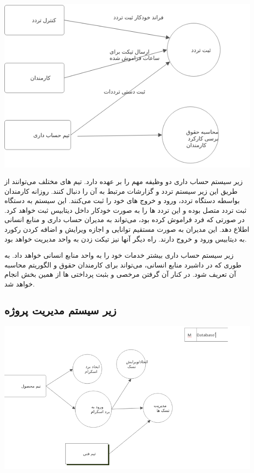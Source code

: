 \includegraphics[scale=0.8]{assets/finance_dfd.png}

زیر سیستم حساب داری دو وظیفه مهم را بر عهده دارد. تیم های مختلف می‌توانند از طریق این زیر سیستم تردد و گزارشات مرتبط به آن را دنبال کنند.
روزانه کارمندان بواسطه دستگاه تردد، ورود و خروج های خود را ثبت می‌کنند.
این سیستم به دستگاه ثبت تردد متصل بوده و این تردد ها را به صورت خودکار داخل دیتابیس ثبت خواهد کرد.
در صورتی که فرد فراموش کرده بود، می‌تواند به مدیران حساب داری و منابع انسانی اطلاع دهد. این مدیران به صورت مستقیم
توانایی و اجازه ویرایش و اضافه کردن رکورد به دیتابیس ورود و خروج دارند.
راه دیگر آنها نیز تیکت زدن به واحد مدیریت خواهد بود.

زیر سیستم حساب داری بیشتر خدمات خود را به واحد منابع انسانی خواهد داد. به طوری که در داشبرد منابع انسانی، می‌تواند برای کارمندان
حقوق و الگوریتم محاسبه آن تعریف شود. در کنار آن گرفتن مرخصی و بثبت پرداختی ها از همین بخش انجام خواهد شد.

\subsection{زیر سیستم مدیریت پروژه}
\includegraphics[scale=0.8]{assets/product_dfd.png}

